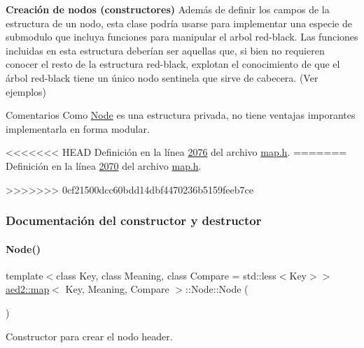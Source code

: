 \begin{Indent}{\bf \-Creación de nodos (constructores)}
Además de definir los campos de la estructura de un nodo, esta clase podría usarse para implementar una especie de submodulo que incluya funciones para manipular el arbol red-\/black. Las funciones incluidas en esta estructura deberían ser aquellas que, si bien no requieren conocer el resto de la estructura red-\/black, explotan el conocimiento de que el árbol red-\/black tiene un único nodo sentinela que sirve de cabecera. (Ver ejemplos)

\begin{DoxyRemark}{Comentarios}
Como \hyperlink{structaed2_1_1map_1_1Node}{Node} es una estructura privada, no tiene ventajas imporantes implementarla en forma modular. 
\end{DoxyRemark}


<<<<<<< HEAD
\-Definición en la línea \hyperlink{map_8h_source_l02076}{2076} del archivo \hyperlink{map_8h_source}{map.\-h}.
=======
Definición en la línea \hyperlink{map_8h_source_l02070}{2070} del archivo \hyperlink{map_8h_source}{map.\+h}.

>>>>>>> 0cf21500dcc60bdd14dbf4470236b5159feeb7ce


\subsubsection{Documentación del constructor y destructor}
\mbox{\label{structaed2_1_1map_1_1Node_a9c1a600491066ce7eb669b1cb76d56c6_a9c1a600491066ce7eb669b1cb76d56c6}} 
\paragraph{\texorpdfstring{Node()}{Node()}\hspace{0.1cm}{\footnotesize\ttfamily [1/2]}}
{\footnotesize\ttfamily template$<$class Key, class Meaning, class Compare = std\+::less$<$\+Key$>$$>$ \\
\hyperlink{classaed2_1_1map}{aed2\+::map}$<$ Key, Meaning, Compare $>$\+::Node\+::\+Node (\begin{DoxyParamCaption}{ }\end{DoxyParamCaption})\hspace{0.3cm}{\ttfamily [inline]}}



Constructor para crear el nodo header. 


\end{Indent}
